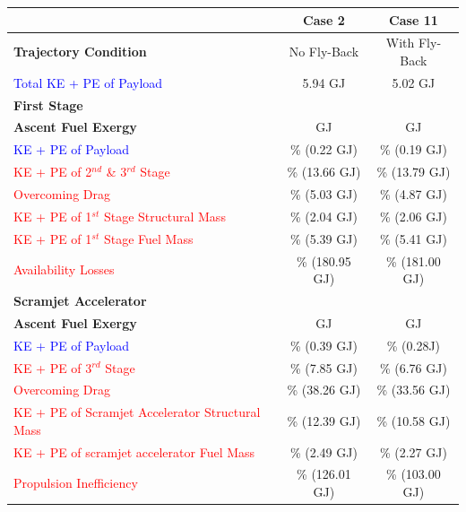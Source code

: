 \begin{table}[!ht]%
	\centering
	\begin{tabular}{l c c} 
		& \textbf{Case 2} & \textbf{Case 11} \\
		\hline \textbf{Trajectory Condition}
		& No Fly-Back
		& With Fly-Back
		\\
		\textcolor{blue}{Total KE + PE of Payload}
		& 5.94 GJ
		& 5.02 GJ
		\\
		
		\textbf{First Stage }  
		&
		&
		\\
		\textbf{Ascent Fuel Exergy} 
		&\textbf{\firstEnergyStandardNoReturn} GJ
		&\textbf{\firstEnergyStandard} GJ
		\\
		
		\textcolor{blue}{KE + PE of Payload}
		& \firstWpayloadStandardNoReturn \% (0.22 GJ)
		& \firstWpayloadStandard \% (0.19 GJ)
		\\
		\textcolor{red}{KE + PE of  2$^{nd}$ \& 3$^{rd}$ Stage}
		& \firstWnextStageStandardNoReturn \% (13.66 GJ)  & \firstWnextStageStandard \% (13.79 GJ)
		\\
		\textcolor{red}{Overcoming Drag} 
		& \WDoneStandardNoReturn \% (5.03 GJ) & \WDoneStandard \% (4.87 GJ)
		\\
		\textcolor{red}{KE + PE of 1$^{st}$ Stage Structural Mass} 
		& \WoneStandardNoReturn \% (2.04 GJ) & \WoneStandard \% (2.06 GJ)
		\\
		\textcolor{red}{KE + PE of 1$^{st}$ Stage Fuel Mass} 
		& \WmFoneStandardNoReturn \% (5.39 GJ) & \WmFoneStandard \% (5.41 GJ)
		\\ 
		\textcolor{red}{Availability Losses}  
		& \PlossoneCombinedStandardNoReturn \% (180.95 GJ) & \PlossoneCombinedStandard \% (181.00 GJ)
		\\ 
		\textbf{Scramjet Accelerator}  
		&
		&
		\\
		\textbf{Ascent Fuel Exergy} 
		& \textbf{\secondEnergyStandardNoReturn} GJ & \textbf{\secondEnergyStandard} GJ
		\\
		\textcolor{blue}{KE + PE of Payload}
		& \secondWpayloadStandardNoReturn \% (0.39 GJ) & \secondWpayloadStandard \% (0.28J)
		\\
		\textcolor{red}{KE + PE of 3$^{rd}$ Stage}
		& \secondWnextStageStandardNoReturn \% (7.85 GJ) & \secondWnextStageStandard \% (6.76 GJ)
		\\
		\textcolor{red}{Overcoming Drag}
		& \WDsecondStandardNoReturn \% (38.26 GJ) & \WDsecondStandard \% (33.56 GJ)
		\\
		\textcolor{red}{KE + PE of Scramjet Accelerator Structural Mass}  
		& \WsecondStandardNoReturn \% (12.39 GJ) & \WsecondStandard \% (10.58 GJ)
		\\
		\textcolor{red}{KE + PE of scramjet accelerator Fuel Mass}  
		& \WmFsecondStandardNoReturn \% (2.49 GJ) & \WmFsecondStandard \% (2.27 GJ)
		\\
		\textcolor{red}{Propulsion Inefficiency}  
		& \PlosssecondStandardNoReturn \% (126.01 GJ) & \PlosssecondStandard \% (103.00 GJ)
		\\
		

\end{tabular}
\end{table}
